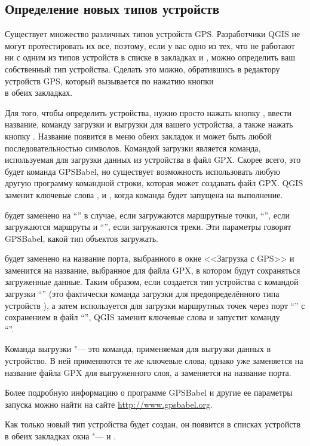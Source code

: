 \subsection{Определение новых типов устройств}\label{sec:Defining-new-device}

Существует множество различных типов устройств GPS. Разработчики QGIS не
могут протестировать их все, поэтому, если у вас одно из тех, что не
работают ни с одним из типов устройств в списке в закладках
 и , можно определить ваш
собственный тип устройства. Сделать это можно, обратившись в редактору
устройств GPS, который вызывается по нажатию кнопки \\
 в обеих закладках.

Для того, чтобы определить устройства, нужно просто нажать кнопку
, ввести название, команду загрузки и выгрузки для
вашего устройства, а также нажать кнопку . Название
появится в меню обеих закладок и может быть любой последовательностью
символов. Командой загрузки является команда, используемая для загрузки
данных из устройства в файл GPX. Скорее всего, это будет команда
GPSBabel, но существует возможность использовать любую другую программу
командной строки, которая может создавать файл GPX. QGIS заменит
ключевые слова ,  и
, когда команда будет запущена на выполнение.

 будет заменено на {}``'' в случае,
если загружаются маршрутные точки, {}``'', если
загружаются маршруты и {}``'', если загружаются треки.
Эти параметры говорят GPSBabel, какой тип объектов загружать.

 будет заменено на название порта, выбранного в окне
<<Загрузка с GPS>> и  заменится на название, выбранное
для файла GPX, в котором будут сохраняться загруженные данные. Таким
образом, если создается тип устройства с командой загрузки
{}``'' (это
фактически команда загрузки для предопределённого типа устройств
), а затем используется
для загрузки маршрутных точек через порт {}``'' с
сохранением в файл {}``'', QGIS заменит ключевые
слова и запустит команду \\
{}``''.

Команда выгрузки "--- это команда, применяемая для выгрузки данных в
устройство. В ней применяются те же ключевые слова, однако
 уже заменяется на название файла GPX для выгруженного
слоя, а  заменяется на название порта.

Более подробную информацию о программе GPSBabel и другие ее параметры
запуска можно найти на сайте \url{http://www.gpsbabel.org}.

Как только новый тип устройства будет создан, он появится в списках
устройств в обеих закладках окна  "--- 
и .

\FloatBarrier
